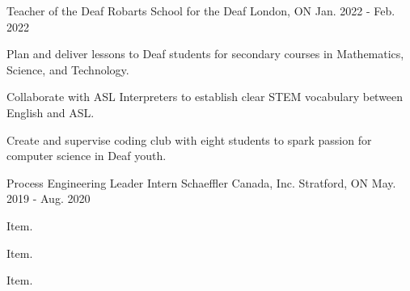 

\begin{cventries}


  \cventry
    {Teacher of the Deaf} %
    {Robarts School for the Deaf} %
    {London, ON} %
    {Jan. 2022 - Feb. 2022} %
    {
      \begin{cvitems} %
        \item {Plan and deliver lessons to Deaf students for secondary courses in Mathematics, Science, and Technology.}
        \item {Collaborate with ASL Interpreters to establish clear STEM vocabulary between English and ASL.}
        \item {Create and supervise coding club with eight students to spark passion for computer science in Deaf youth.}
      \end{cvitems}
    }
    

    

  \cventry
    {Process Engineering Leader Intern} %
    {Schaeffler Canada, Inc.} %
    {Stratford, ON} %
    {May. 2019 - Aug. 2020} %
    {
      \begin{cvitems} %
        \item {Item.}
        \item {Item.}
        \item {Item.}
      \end{cvitems}
    }
    

\end{cventries}
